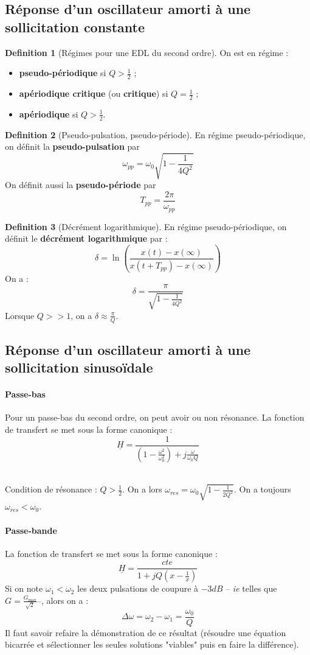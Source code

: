 \documentclass[french]{book}
\theoremstyle{plain}
\theoremstyle{definition}
\newtheorem{dfn}{Definition}
\theoremstyle{remark}
\begin{document}
\subsection{Réponse d'un oscillateur amorti à une sollicitation constante}
\begin{dfn}[Régimes pour une EDL du second ordre]
	On est en régime : 
\begin{itemize}
	\item \textbf{pseudo-périodique} si $Q>\displaystyle\frac{1}{2}$ ;
	\item \textbf{apériodique critique } (ou \textbf{critique}) si $Q=\displaystyle\frac{1}{2}$ ;
	\item \textbf{apériodique} si $Q>\displaystyle\frac{1}{2}$.
\end{itemize}
\end{dfn}
\begin{dfn}[Pseudo-pulsation, pseudo-période]
	En régime pseudo-périodique, on définit la \textbf{pseudo-pulsation} par $$\omega_{pp}=\omega_0\sqrt{1-\frac{1}{4Q^2}}$$ On définit aussi la \textbf{pseudo-période} par $$T_{pp}=\frac{2\pi}{\omega_{pp}}$$
\end{dfn}
\begin{dfn}[Décrément logarithmique]
	En régime pseudo-périodique, on définit le \textbf{décrément logarithmique} par : $$\delta=\ln\left(\frac{x(t)-x(\infty)}{x(t+T_{pp})-x(\infty)}\right)$$ On a : $$\delta=\frac{\pi}{\displaystyle\sqrt{1-\frac{1}{4Q^2}}}$$ Lorsque $Q>>1$, on a $\delta\approx\displaystyle\frac{\pi}{Q}$.
\end{dfn}
\subsection{Réponse d'un oscillateur amorti à une sollicitation sinusoïdale}
\paragraph{Passe-bas} Pour un passe-bas du second ordre, on peut avoir ou non résonance. La fonction de transfert se met sous la forme canonique : $$\underline{H}=\frac{1}{\displaystyle\left(1-\frac{\omega^2}{\omega_0^2}\right)+j\frac{\omega}{\omega_0Q}}$$ \\ \par Condition de résonance : $Q>\displaystyle\frac{1}{2}$. On a lors $\omega_{res}=\omega_0\sqrt{\displaystyle1-\frac{1}{2Q^2}}$. On a toujours $\omega_{res}<\omega_0$.
\paragraph{Passe-bande} La fonction de transfert se met sous la forme canonique : $$\underline{H}=\frac{cte}{1+jQ\displaystyle\left(x-\frac{1}{x}\right)}$$ Si on note $\omega_1<\omega_2$ les deux pulsations de coupure à $-3dB$ -- \textit{ie} telles que $G=\displaystyle\frac{G_{\max}}{\sqrt{2}}$--, alors on a : $$\Delta\omega=\omega_2-\omega_1=\frac{\omega_0}{Q}$$ Il faut savoir refaire la démonstration de ce résultat (résoudre une équation bicarrée et sélectionner les seules solutions "viables" puis en faire la différence).
\end{document}
